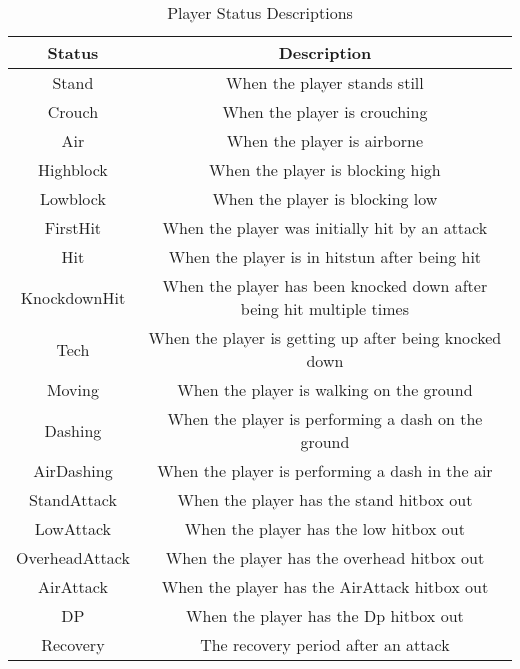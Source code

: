\begin{table}[h]
	\centering
	\caption{Player Status Descriptions}
	\begin{tabular}{| c | c |}
		\hline
		Status & Description \\
		\hline
		Stand & When the player stands still \\
		\hline
		Crouch & When the player is crouching \\
		\hline
		Air & When the player is airborne \\
		\hline
		Highblock & When the player is blocking high \\
		\hline
		Lowblock &  When the player is blocking low \\
		\hline
		FirstHit & When the player was initially hit by an attack \\
		\hline
		Hit & When the player is in hitstun after being hit \\
		\hline
		KnockdownHit & When the player has been knocked down after being hit multiple times \\
		\hline
		Tech & When the player is getting up after being knocked down \\
		\hline
		Moving & When the player is walking on the ground \\
		\hline
		Dashing & When the player is performing a dash on the ground \\
		\hline
		AirDashing & When the player is performing a dash in the air \\
		\hline
		StandAttack & When the player has the stand hitbox out\\
		\hline 
		LowAttack & When the player has the low hitbox out\\
		\hline 
		OverheadAttack & When the player has the overhead hitbox out\\
		\hline 
		AirAttack & When the player has the AirAttack hitbox out\\
		\hline
		DP& When the player has the Dp hitbox out\\
		\hline 
		Recovery & The recovery period after an attack\\
		\hline
	\end{tabular}
	\label{playerstatus}
\end{table}

